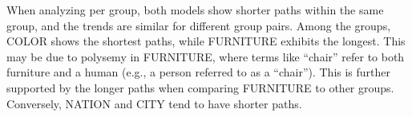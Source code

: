 When analyzing per group, both models show shorter paths within the same group, and the trends are similar for different group pairs. Among the groups, COLOR shows the shortest paths, while FURNITURE exhibits the longest. This may be due to polysemy in FURNITURE, where terms like ``chair'' refer to both furniture and a human (e.g., a person referred to as a ``chair''). This is further supported by the longer paths when comparing FURNITURE to other groups. Conversely, NATION and CITY tend to have shorter paths.








